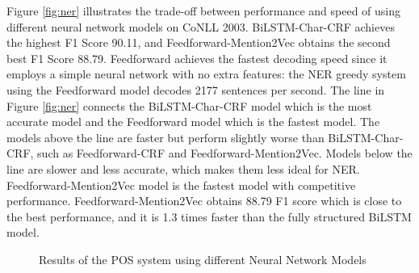 Figure \ref{fig:ner} illustrates the trade-off between performance and speed of using different neural network models on CoNLL 2003. BiLSTM-Char-CRF achieves the highest F1 Score 90.11, and Feedforward-Mention2Vec obtains the second best F1 Score 88.79. Feedforward achieves the fastest decoding speed since it employs a simple neural network with no extra features: the NER greedy system using the Feedforward model decodes 2177 sentences per second. The line in Figure \ref{fig:ner} connects the BiLSTM-Char-CRF model which is the most accurate model and the Feedforward model which is the fastest model. The models above the line are faster but perform slightly worse than BiLSTM-Char-CRF, such as Feedforward-CRF and Feedforward-Mention2Vec. Models below the line are slower and less accurate, which makes them less ideal for NER. Feedforward-Mention2Vec model is the fastest model with competitive performance. Feedforward-Mention2Vec obtains 88.79 F1 score which is close to the best performance, and it is 1.3 times faster than the fully structured BiLSTM model.

\begin{figure}
 \caption{Results of the POS system using different Neural Network Models}
  \label{fig:pos}
\end{figure}

